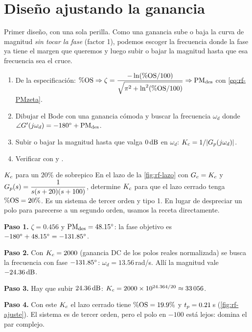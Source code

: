 \section{Diseño ajustando la ganancia}
\label{sec:rf-ajuste}

Primer diseño, con una sola perilla. Como una ganancia sube o baja la curva de magnitud \emph{sin tocar la fase} (factor 1), podemos escoger la frecuencia donde la fase ya tiene el margen que queremos y luego subir o bajar la magnitud hasta que esa frecuencia sea el cruce.

\begin{receta}
\begin{enumerate}
  \item De la especificación: $\%\mathrm{OS}\Rightarrow\zeta=\dfrac{-\ln(\%\mathrm{OS}/100)}{\sqrt{\pi^2+\ln^2(\%\mathrm{OS}/100)}}\Rightarrow\mathrm{PM}_{\mathrm{des}}$ con \eqref{eq:rf-PMzeta}.
  \item Dibujar el Bode con una ganancia cómoda y buscar la frecuencia $\omega_d$ donde $\angle G'(j\omega_d)=-180^{\circ}+\mathrm{PM}_{\mathrm{des}}$.
  \item Subir o bajar la magnitud hasta que valga $0\,\mathrm{dB}$ en $\omega_d$: $K_c=1/|G_p(j\omega_d)|$.
  \item Verificar con  y .
\end{enumerate}
\end{receta}

\begin{ejemplo}[label=ej:rf-ajuste]{$K_c$ para un $20\%$ de sobrepico}
En el lazo de la \cref{fig:rf-lazo} con $G_c=K_c$ y $G_p(s)=\dfrac{1}{s(s+20)(s+100)}$, determine $K_c$ para que el lazo cerrado tenga $\%\mathrm{OS}=20\%$.
\solucion Es un sistema de tercer orden y tipo 1. En lugar de despreciar un polo para parecerse a un segundo orden, usamos la receta directamente.

\textbf{Paso 1.} $\zeta=0.456$ y $\mathrm{PM}_{\mathrm{des}}=48.15^{\circ}$: la fase objetivo es $-180^{\circ}+48.15^{\circ}=-131.85^{\circ}$.

\textbf{Paso 2.} Con $K_c=2000$ (ganancia DC de los polos reales normalizada) se busca la frecuencia con fase $-131.85^{\circ}$: $\omega_d=13.56$\,rad/s. Allí la magnitud vale $-24.36\,\mathrm{dB}$.

\textbf{Paso 3.} Hay que subir $24.36\,\mathrm{dB}$: $K_c=2000\times10^{24.364/20}\approx33\,056$.

\textbf{Paso 4.} Con este $K_c$ el lazo cerrado tiene $\%\mathrm{OS}=19.9\%$ y $t_p=0.21$\,s (\cref{fig:rf-ajuste}). El sistema es de tercer orden, pero el polo en $-100$ está lejos: domina el par complejo.
\end{ejemplo}

